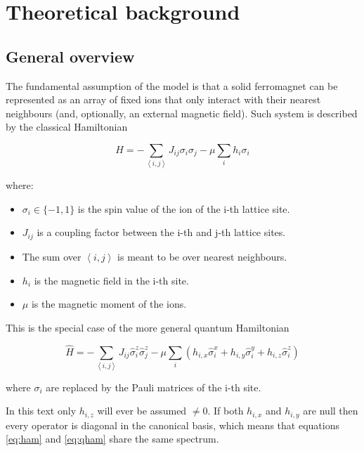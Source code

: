 \chapter{Theoretical background}
\section{General overview}

The fundamental assumption of the model is that a solid ferromagnet can be represented as an array of fixed ions that only interact with their nearest neighbours (and, optionally, an external magnetic field). Such system is described by the classical Hamiltonian

\begin{equation}
  \label{eq:ham}
  H = - \sum_{\left< i, j \right>} J_{ij} \sigma_i \sigma_j - \mu \sum_{i} h_i \sigma_i
\end{equation}

where:

\begin{itemize}
  \item $\sigma_i \in \{-1, 1\}$ is the spin value of the ion of the i-th lattice site.
  \item $J_{ij}$ is a coupling factor between the i-th and j-th lattice sites.
  \item The sum over $\left< i, j \right>$ is meant to be over nearest neighbours.
  \item $h_i$ is the magnetic field in the i-th site.
  \item $\mu$ is the magnetic moment of the ions.
\end{itemize}

This is the special case of the more general quantum Hamiltonian 

\begin{equation}
  \label{eq:qham}
  \hat{H} = - \sum_{\left< i, j \right>} J_{ij} \hat{\sigma}_i^z \hat{\sigma}_j^z - \mu \sum_{i} \left( h_{i,x} \hat{\sigma}_i^x + h_{i,y} \hat{\sigma}_i^y + h_{i,z} \hat{\sigma}_i^z \right)
\end{equation}

where $\sigma_i$ are replaced by the Pauli matrices of the i-th site.

In this text only $ h_{i,z} $ will ever be assumed $\neq 0$. If both $ h_{i,x} $ and $ h_{i,y} $ are null then every operator is diagonal in the canonical basis, which means that equations \ref{eq:ham} and \ref{eq:qham} share the same spectrum.

